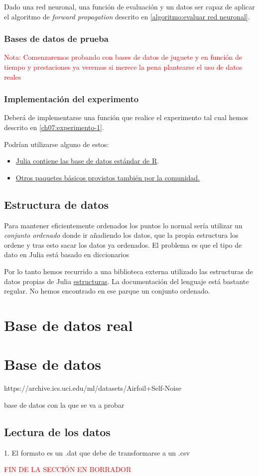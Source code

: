 Dado una red neuronal, una función de evaluación y un datos ser capaz de aplicar el algoritmo de \textit{forward propagation} descrito en \ref{algoritmo:evaluar red neuronal}.


\subsubsection{Bases de datos de prueba}
\textcolor{red}{Nota:
Comenzaremos probando con bases de datos de juguete 
y en función de tiempo y prestaciones ya veremos si merece la pena plantearse el uso de datos reales
}

\subsubsection{Implementación del experimento} 
Deberá de implementarse una función que realice el 
experimento tal cual hemos descrito en \ref{ch07:experimento-1}.

Podrían utilizarse alguno de estos: 

\begin{itemize}
    \item \href{https://github.com/JuliaStats/RDatasets.jl}{Julia contiene las base de datos estándar de R}.
    \item \href{https://juliaml.github.io/MLDatasets.jl/stable/}{Otros paquetes básicos provistos también por la comunidad.}
\end{itemize}

\subsection*{Estructura de datos}
Para mantener eficientemente ordenados los puntos 
lo normal sería utilizar un \textit{conjunto ordenado} donde ir añadiendo los datos, que la propia estructura los ordene y tras esto sacar
los datos ya ordenados. 
El problema es que el tipo de dato  en Julia está basado en diccionarios

Por lo tanto hemos recurrido a una biblioteca externa
utilizado las estructuras de datos propias de Julia 
\href{https://juliacollections.github.io/DataStructures.jl/v0.9/sorted_containers.html}{estructuras}. 
La documentación del lenguaje está bastante regular. 
No hemos encontrado en ese parque un conjunto ordenado. 


\section{Base de datos real}

\section{Base de datos }

https://archive.ics.uci.edu/ml/datasets/Airfoil+Self-Noise

base de datos con la que se va a probar

\subsection{Lectura de los datos} 

1. El formato es un .dat que debe de transformarse a un .csv


\textcolor{red}{FIN DE LA SECCIÓN EN BORRADOR}